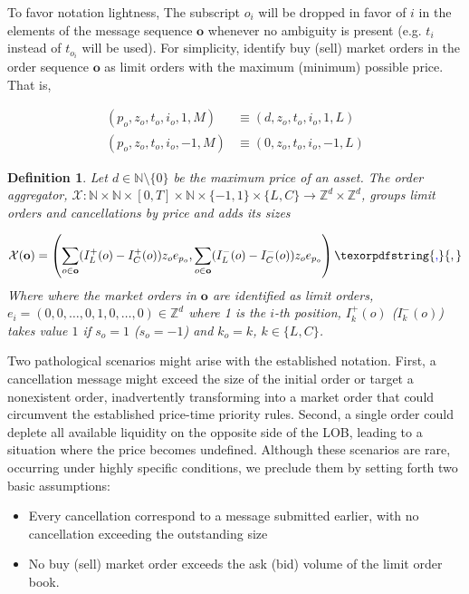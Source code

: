 \documentclass[10pt,a4paper,oneside]{article}
\newcommand{\N}{\mathbb{N}}
\newcommand{\Z}{\mathbb{Z}}
\newtheorem{definition}{Definition}
\providecommand{\DIFaddtex}[1]{{\protect\color{blue} \sf #1}} %
\providecommand{\DIFdeltex}[1]{{\protect\color{red} \scriptsize #1}} %
\providecommand{\DIFaddbegin}{} %
\providecommand{\DIFaddend}{} %
\providecommand{\DIFdelbegin}{} %
\providecommand{\DIFdelend}{} %
\providecommand{\DIFadd}[1]{\texorpdfstring{\DIFaddtex{#1}}{#1}} %
\providecommand{\DIFdel}[1]{\texorpdfstring{\DIFdeltex{#1}}{}} %
\newcommand{\DIFscaledelfig}{0.5}
\newlength{\DIFdelgraphicswidth} %
\newlength{\DIFdelgraphicsheight} %
\newcommand{\DIFaddincludegraphics}[2][]{{\color{blue}\fbox{\DIFOincludegraphics[#1]{#2}}}} %
\newcommand{\DIFdelincludegraphics}[2][]{%
\sbox{\DIFdelgraphicsbox}{\DIFOincludegraphics[#1]{#2}}%
\settoboxwidth{\DIFdelgraphicswidth}{\DIFdelgraphicsbox} %
\settoboxtotalheight{\DIFdelgraphicsheight}{\DIFdelgraphicsbox} %
\scalebox{\DIFscaledelfig}{%
\parbox[b]{\DIFdelgraphicswidth}{\usebox{\DIFdelgraphicsbox}\\[-\baselineskip] \rule{\DIFdelgraphicswidth}{0em}}\llap{\resizebox{\DIFdelgraphicswidth}{\DIFdelgraphicsheight}{%
\setlength{\unitlength}{\DIFdelgraphicswidth}%
\begin{picture}(1,1)%
\thicklines\linethickness{2pt} %
{\color[rgb]{1,0,0}\put(0,0){\framebox(1,1){}}}%
{\color[rgb]{1,0,0}\put(0,0){\line( 1,1){1}}}%
{\color[rgb]{1,0,0}\put(0,1){\line(1,-1){1}}}%
\end{picture}%
}\hspace*{3pt}}} %
} %
\DeclareRobustCommand{\DIFaddbegin}{\DIFOaddbegin \let\includegraphics\DIFaddincludegraphics} %
\DeclareRobustCommand{\DIFaddend}{\DIFOaddend \let\includegraphics\DIFOincludegraphics} %
\DeclareRobustCommand{\DIFdelbegin}{\DIFOdelbegin \let\includegraphics\DIFdelincludegraphics} %
\DeclareRobustCommand{\DIFdelend}{\DIFOaddend \let\includegraphics\DIFOincludegraphics} %
\begin{document}
To favor notation lightness, The subscript $o_i$ will be dropped in favor of $i$ in the elements of the message sequence $\mathbf{o}$ whenever no ambiguity is present (e.g. $t_i$ instead of $t_{o_i}$ will be used). For simplicity, identify buy (sell) market orders in the order sequence $\mathbf{o}$ as limit orders with the maximum (minimum) possible price. That is, 
\DIFaddbegin 

\DIFaddend \begin{align*}
    (p_o, z_o, t_o, i_o, 1,  M) &\equiv (d, z_o, t_o, i_o, 1, L) \\
    (p_o, z_o, t_o, i_o, -1, M) &\equiv (0, z_o, t_o, i_o, -1, L)
\end{align*}


\begin{definition}
Let $d \in \N \setminus \{ 0 \}$ be the maximum price of an asset. The order aggregator, $\mathcal{X} : \N \times \N \times [0, T] \times \N \times \{-1, 1 \} \times \{ L, C\} \rightarrow \Z^d \times \Z^d$, groups limit orders and cancellations by price and adds its sizes

$$
\mathcal{X}(\mathbf{o}) = \left( \sum_{o \in \mathbf{o}} (I^+_L(o) - I^+_C(o)) z_o e_{p_o}, \sum_{o \in \mathbf{o}} (I^-_L(o) - I^-_C(o)) z_o e_{p_o} \right)\DIFaddbegin \DIFadd{,
}\DIFaddend $$
\DIFdelbegin \DIFdel{Where }\DIFdelend \DIFaddbegin \DIFadd{where }\DIFaddend the market orders in $\mathbf{o}$ are identified as limit orders, $e_i = (0, 0, \dots, 0, 1, 0, \dots, 0) \in \Z^d$ where 1 is the $i$-th position, $I^+_k(o)$ ($I^-_k(o)$) takes value $1$ if $s_o = 1$ ($s_o = -1$) and $k_o = k$, $k \in \{ L, C\}$.
\label{def:order_aggregator}
\end{definition}


Two pathological scenarios might arise with the established notation. First, a cancellation message might exceed the size of the initial order or target a nonexistent order, inadvertently transforming into a market order that could circumvent the established price-time priority rules. Second, a single order could deplete all available liquidity on the opposite side of the LOB, leading to a situation where the price becomes undefined. Although these scenarios are rare, occurring under highly specific conditions, we preclude them by setting forth two basic assumptions:

\begin{itemize}
    \item[(A1)] Every cancellation correspond to a message submitted earlier, with no cancellation exceeding the outstanding size 
    \item[(A2)] No buy (sell) market order exceeds the ask (bid) volume of the limit order book.
\end{itemize}
\end{document}
